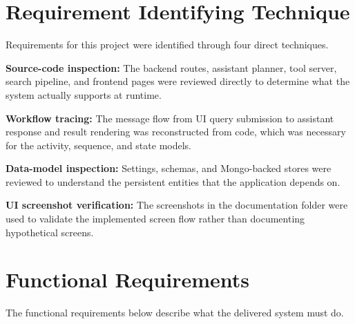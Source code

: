 \documentclass[12pt,a4paper,oneside]{report}
\begin{document}
\section{Requirement Identifying Technique}
Requirements for this project were identified through four direct techniques.

\textbf{Source-code inspection:} The backend routes, assistant planner, tool server, search pipeline, and frontend pages were reviewed directly to determine what the system actually supports at runtime.

\textbf{Workflow tracing:} The message flow from UI query submission to assistant response and result rendering was reconstructed from code, which was necessary for the activity, sequence, and state models.

\textbf{Data-model inspection:} Settings, schemas, and Mongo-backed stores were reviewed to understand the persistent entities that the application depends on.

\textbf{UI screenshot verification:} The screenshots in the documentation folder were used to validate the implemented screen flow rather than documenting hypothetical screens.

\section{Functional Requirements}
The functional requirements below describe what the delivered system must do.
\end{document}
